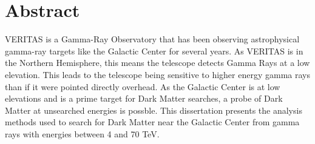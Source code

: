 \cleartooddpage[\thispagestyle{empty}]
\section*{Abstract}

VERITAS is a Gamma-Ray Observatory that has been observing astrophysical gamma-ray targets like the Galactic Center for several years.
As VERITAS is in the Northern Hemisphere, this means the telescope detects Gamma Rays at a low elevation.
This leads to the telescope being sensitive to higher energy gamma rays than if it were pointed directly overhead.
As the Galactic Center is at low elevations and is a prime target for Dark Matter searches, a probe of Dark Matter at unsearched energies is possble.
This dissertation presents the analysis methods used to search for Dark Matter near the Galactic Center from gamma rays with energies between 4 and 70 TeV.



\cleartoevenpage[\thispagestyle{plain}]
\null
